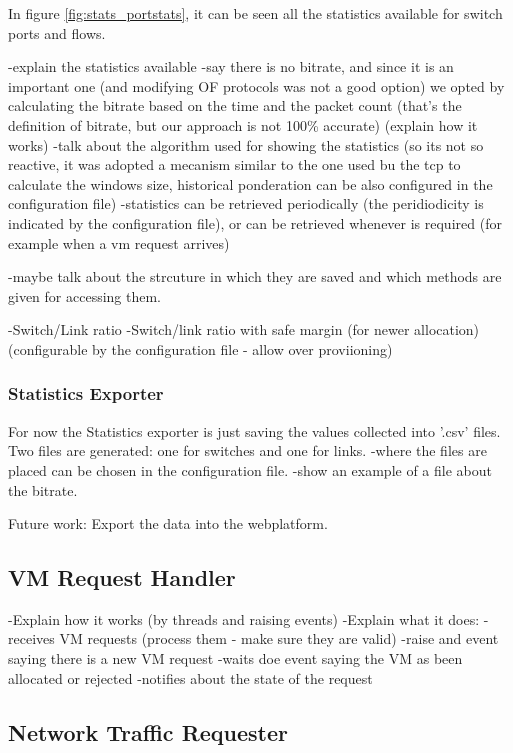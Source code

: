 \documentclass[12pt,english,oneside]{book}
\begin{document}
In figure \ref{fig:stats_portstats}, it can be seen all the statistics available for switch ports and flows.

-explain the statistics available
-say there is no bitrate, and since it is an important one (and modifying OF protocols was not a good option) we opted by calculating the bitrate based on the time and the packet count (that's the definition of bitrate, but our approach is not 100\% accurate) (explain how it works)
-talk about the algorithm used for showing the statistics (so its not so reactive, it was adopted a mecanism similar to the one used bu the tcp to calculate the windows size, historical ponderation can be also configured in the configuration file)
-statistics can be retrieved periodically (the peridiodicity is indicated by the configuration file), or can be retrieved whenever is required (for example when a vm request arrives)

-maybe talk about the strcuture in which they are saved and which methods are given for accessing them. 

-Switch/Link ratio
-Switch/link ratio with safe margin (for newer allocation) (configurable by the configuration file - allow over proviioning)


\subsubsection{Statistics Exporter}
\hspace{0.6cm}

For now the Statistics exporter is just saving the values collected into '.csv' files. Two files are generated: one for switches and one for links.
-where the files are placed can be chosen in the configuration file.
-show an example of a file about the bitrate.

Future work:
Export the data into the webplatform.

\subsection{VM Request Handler}
\hspace{0.6cm}

-Explain how it works (by threads and raising events)
-Explain what it does:
  -receives VM requests (process them - make sure they are valid)
  -raise and event saying there is a new VM request
  -waits doe event saying the VM as been allocated or rejected
  -notifies about the state of the request

\subsection{Network Traffic Requester}
\hspace{0.6cm}
\end{document}
